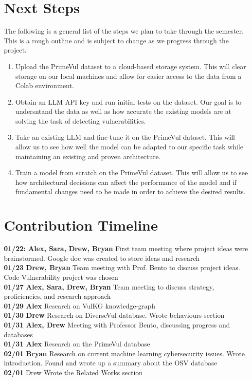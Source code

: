 \documentclass{article}
\begin{document}
\section{Next Steps}
The following is a general list of the steps we plan to take through the semester.
This is a rough outline and is subject to change as we progress through the project.

\begin{enumerate}
  \item Upload the PrimeVul dataset to a cloud-based storage system. This will clear 
    storage on our local machines and allow for 
    easier access to the data from a Colab environment.
  \item Obtain an LLM API key and run initial tests on the dataset. Our goal is to 
    undersntand the data as well as how accurate the existing models are at solving
    the task of detecting vulnerabilities.
  \item Take an existing LLM and fine-tune it on the PrimeVul dataset. This will allow
    us to see how well the model can be adapted to our specific task while maintaining
    an existing and proven architecture.
  \item Train a model from scratch on the PrimeVul dataset. This will allow us to see
    how architectural decisions can affect the performance of the model and if fundamental
    changes need to be made in order to achieve the desired results.
\end{enumerate}

\section{Contribution Timeline}
\textbf{01/22: Alex, Sara, Drew, Bryan} First team meeting where project ideas were
brainstormed. Google doc was created to store ideas and research \\
\textbf{01/23 Drew, Bryan} Team meeting with Prof. Bento to discuss project ideas.
Code Vulnerability project was chosen \\
\textbf{01/27 Alex, Sara, Drew, Bryan} Team meeting to discuss strategy, proficiencies, 
and research approach \\
\textbf{01/29 Alex} Research on VulKG knowledge-graph \\
\textbf{01/30 Drew} Research on DiverseVul database. Wrote behaviours section \\
\textbf{01/31 Alex, Drew} Meeting with Professor Bento, discussing progress and databases \\
\textbf{01/31 Alex} Research on the PrimeVul database \\
\textbf{02/01 Bryan} Research on current machine learning cybersecurity issues. Wrote
introduction. Found and wrote up a summary about the OSV database \\
\textbf{02/01} Drew Wrote the Related Works section \\

      

\end{document}
